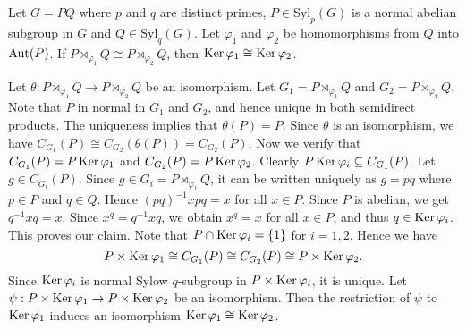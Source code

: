\begin{lemma} \label{lemma-noob}
	Let $G = PQ$ where $p$ and $q$ are distinct primes, $P \in \text{Syl}_p(G)$ is a normal abelian subgroup in $G$ and $Q \in \text{Syl}_q(G)$. Let $\varphi_1$ and $\varphi_2$ be homomorphisms from $Q$ into $\operatorname{Aut} (P)$. If $P\rtimes_{\varphi_1} Q \cong P\rtimes_{\varphi_2} Q$,   then $\operatorname{Ker} \varphi_1 \cong \operatorname{Ker} \varphi_2$.
\end{lemma}
\begin{sketch}
	Let $\theta: P\rtimes_{\varphi_1} Q \rightarrow P\rtimes_{\varphi_2} Q$ be an isomorphism. Let $G_1 = P\rtimes_{\varphi_1} Q$ and $G_2 = P\rtimes_{\varphi_2} Q$. Note that  $P$ in normal in $G_1$ and $G_2$, and hence unique  in both semidirect products. The uniqueness implies that $\theta(P) = P$. Since $\theta$ is an isomorphism, we have $C_{G_1}(P) \cong C_{G_2}(\theta(P)) = C_{G_2}(P)$. Now we verify that $C_{G_1}(P) = P\operatorname{Ker} \varphi_1$ and $C_{G_2}(P) = P\operatorname{Ker} \varphi_2$. Clearly $P\operatorname{Ker} \varphi_i \subseteq C_{G_1}(P)$. Let $g\in C_{G_i}(P)$. Since $g\in G_i = P\rtimes_{\varphi_1} Q$,  it can be written uniquely as $g = pq$ where $p\in P$ and $q\in Q$. Hence $(pq)^{-1}xpq = x$ for all $x\in P$. Since $P$ is abelian, we get $q^{-1}xq = x$. Since $x^{q} = q^{-1}xq$, we obtain $x^q = x$ for all $x\in P$, and thus $q\in\operatorname{Ker} \varphi_i$. This proves our claim. Note that $P\cap \operatorname{Ker}\varphi_i =\{1\}$ for $i=1,2$. Hence we have 
	\begin{equation*}
	P\times \operatorname{Ker} \varphi_1\cong	C_{G_1}(P) \cong  C_{G_2}(P) \cong P\times \operatorname{Ker} \varphi_2.
	\end{equation*}
	Since $\operatorname{Ker} \varphi_i$ is normal Sylow $q$-subgroup in $P\times \operatorname{Ker} \varphi_i$, it is unique. Let $\psi:P\times \operatorname{Ker} \varphi_1\rightarrow P\times \operatorname{Ker} \varphi_2$ be an isomorphism. Then the restriction of $\psi$ to $\operatorname{Ker} \varphi_1$ induces an isomorphism $\operatorname{Ker}\varphi_1 \cong \operatorname{Ker}\varphi_2$.
\end{sketch} 


